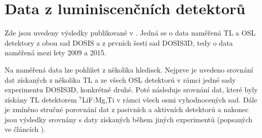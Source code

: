 \section{Data z luminiscenčních detektorů}\label{sec:dosis_vysledky}
Zde jsou uvedeny výsledky publikované v \cite{dosis}. Jedná se o data naměřená TL a OSL detektory z obou sad DOSIS a z prvních šesti sad DOSIS3D, tedy o data naměřená mezi lety 2009 a 2015. %

Na naměřená data lze pohlížet z několika hledisek. Nejprve je uvedeno srovnání dat získaných z několika TL a ze všech OSL detektorů v rámci jedné sady experimentu DOSIS3D, konkrétně druhé. Poté následuje srovnání dat, které byly získány TL detektorem $^7$LiF:Mg,Ti v rámci všech osmi vyhodnocených sad. Dále je zmíněno stručné porovnání dat z pasivních a aktivních detektorů a nakonec jsou výsledky srovnány s daty získaných během jiných experimentů (popsaných ve článcích \cite{passDetectors, dataTLD_RR, ambrozova_dvaExperimenty, pille, pille2, wrmiss_SPD, japonsky}).
